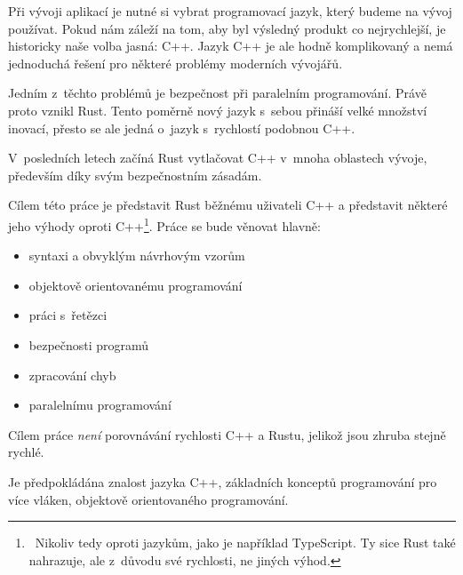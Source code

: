 \documentclass[main.tex]{subfiles}
\begin{document}


Při vývoji aplikací je nutné si vybrat programovací jazyk, který budeme na vývoj
používat. Pokud nám záleží na tom, aby byl výsledný produkt co nejrychlejší,
je historicky naše volba jasná: C++. Jazyk C++ je ale hodně komplikovaný a nemá
jednoduchá řešení pro některé problémy moderních vývojářů.

Jedním z~těchto problémů je bezpečnost při paralelním programování. Právě proto
vznikl Rust. Tento poměrně nový jazyk s~sebou přináší velké množství inovací, přesto
se ale jedná o~jazyk s~rychlostí podobnou C++.

V~posledních letech začíná Rust vytlačovat C++ v~mnoha oblastech vývoje, především
díky svým bezpečnostním zásadám.


Cílem této práce je představit Rust běžnému uživateli C++ a představit některé jeho výhody
oproti C++\footnote{~Nikoliv tedy oproti jazykům, jako je například TypeScript. Ty sice
    Rust také nahrazuje, ale z~důvodu své rychlosti, ne jiných výhod.
}. Práce se bude věnovat hlavně:
\begin{itemize}
    \item syntaxi a obvyklým návrhovým vzorům
    \item objektově orientovanému programování
    \item práci s~řetězci
    \item bezpečnosti programů
    \item zpracování chyb
    \item paralelnímu programování
\end{itemize}

Cílem práce \emph{není} porovnávání rychlosti C++ a Rustu, jelikož jsou zhruba stejně
rychlé.


Je předpokládána znalost jazyka C++, základních konceptů programování pro více vláken,
objektově orientovaného programování.
\end{document}
